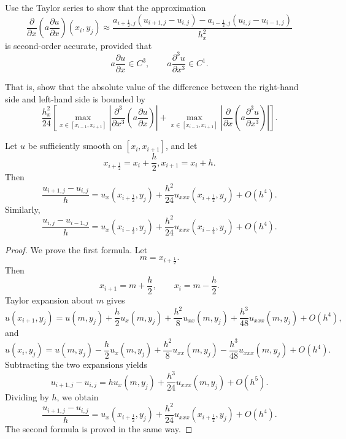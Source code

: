 \documentclass{ctexart}
\newif\ifpreface
\begin{document}
\large
\setlength{\baselineskip}{1.2em}
\ifpreface

\newgeometry{left=2cm,right=2cm,top=2cm,bottom=2cm}
\else
{}
\maketitle
\fi
\begin{problem}\label{pro:1}
  Use the Taylor series to show that the approximation
  \[
    \frac{\partial}{\partial x}
    \left(
      a\frac{\partial u}{\partial x}
    \right)(x_i,y_j)
    \approx
    \frac{
      a_{i+\frac12,j}(u_{i+1,j}-u_{i,j})
      -
      a_{i-\frac12,j}(u_{i,j}-u_{i-1,j})
    }{
      h_x^2
    }
  \]
  is second-order accurate, provided that
  \[
    a\frac{\partial u}{\partial x}\in C^3,
    \qquad
    a\frac{\partial^3 u}{\partial x^3}\in C^1.
  \]

  That is, show that the absolute value of the difference between the
  right-hand side and left-hand side is bounded by
  \[
    \frac{h_x^2}{24}
    \left[
      \max_{x\in[x_{i-1},x_{i+1}]}
      \left|
      \frac{\partial^3}{\partial x^3}
      \left(
        a\frac{\partial u}{\partial x}
      \right)
      \right|
      +
      \max_{x\in[x_{i-1},x_{i+1}]}
      \left|
      \frac{\partial}{\partial x}
      \left(
        a\frac{\partial^3 u}{\partial x^3}
      \right)
      \right|
    \right].
  \]
\end{problem}
\begin{lemma}
  Let \(u\) be sufficiently smooth on \([x_i,x_{i+1}]\), and let
  \[
    x_{i+\frac12}=x_i + \frac{h}{2},x_{i + 1}= x_i + h.
  \]
  Then
  \[
    \frac{u_{i+1,j}-u_{i,j}}{h}
    =
    u_x(x_{i+\frac12},y_j)
    +
    \frac{h^2}{24}
    u_{xxx}(x_{i+\frac12},y_j)
    +
    O(h^4).
  \]
  Similarly,
  \[
    \frac{u_{i,j}-u_{i-1,j}}{h}
    =
    u_x(x_{i-\frac12},y_j)
    +
    \frac{h^2}{24}
    u_{xxx}(x_{i-\frac12},y_j)
    +
    O(h^4).
  \]
\end{lemma}

\begin{proof}
  We prove the first formula. Let
  \[
    m=x_{i+\frac12}.
  \]
  Then
  \[
    x_{i+1}=m+\frac{h}{2},
    \qquad
    x_i=m-\frac{h}{2}.
  \]
  Taylor expansion about \(m\) gives
  \[
    u(x_{i+1},y_j)
    =
    u(m,y_j)
    +
    \frac{h}{2}u_x(m,y_j)
    +
    \frac{h^2}{8}u_{xx}(m,y_j)
    +
    \frac{h^3}{48}u_{xxx}(m,y_j)
    +
    O(h^4),
  \]
  and
  \[
    u(x_i,y_j)
    =
    u(m,y_j)
    -
    \frac{h}{2}u_x(m,y_j)
    +
    \frac{h^2}{8}u_{xx}(m,y_j)
    -
    \frac{h^3}{48}u_{xxx}(m,y_j)
    +
    O(h^4).
  \]
  Subtracting the two expansions yields
  \[
    u_{i+1,j}-u_{i,j}
    =
    hu_x(m,y_j)
    +
    \frac{h^3}{24}u_{xxx}(m,y_j)
    +
    O(h^5).
  \]
  Dividing by \(h\), we obtain
  \[
    \frac{u_{i+1,j}-u_{i,j}}{h}
    =
    u_x(x_{i+\frac12},y_j)
    +
    \frac{h^2}{24}u_{xxx}(x_{i+\frac12},y_j)
    +
    O(h^4).
  \]
  The second formula is proved in the same way.
\end{proof}
\end{document}
